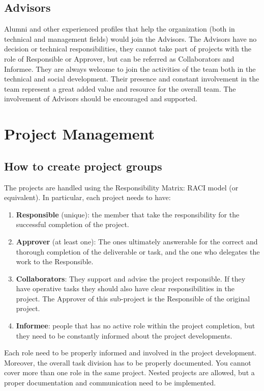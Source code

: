 \documentclass[graybox]{svmult}
\begin{document}
\subsection{Advisors}
Alumni and other experienced profiles that help the organization (both in technical and management fields) would join the Advisors. The Advisors have no decision or technical responsibilities, they cannot take part of projects with the role of Responsible or Approver, but can be referred as Collaborators and Informee. They are always welcome to join the activities of the team both in the technical and social development. Their presence and constant involvement in the team represent a great added value and resource for the overall team. The involvement of Advisors should be encouraged and supported.

\section{Project Management}
\label{sec:3}

\subsection{How to create project groups}
The projects are handled using the Responsibility Matrix: RACI model (or equivalent). 
In particular, each project needs to have:
\begin{enumerate}
\item \textbf{Responsible} (unique): the member that take the responsibility for the successful completion of the project.
\item \textbf{Approver} (at least one): The ones ultimately answerable for the correct and thorough completion of the deliverable or task, and the one who delegates the work to the Responsible.
\item \textbf{Collaborators}: They support and advise the project responsible. If they have operative tasks they should also have clear responsibilities in the project. The Approver of this sub-project is the Responsible of the original project.
\item \textbf{Informee}: people that has no active role within the project completion, but they need to be constantly informed about the project developments.
\end{enumerate}
Each role need to be properly informed and involved in the project development. Moreover, the overall task division has to be properly documented. You cannot cover more than one role in the same project.
Nested projects are allowed, but a proper documentation and communication need to be implemented.
\end{document}

